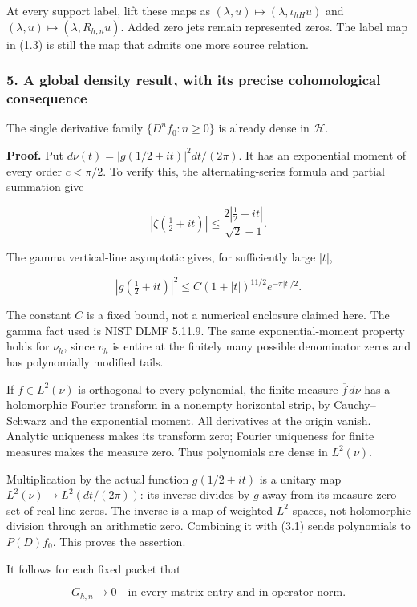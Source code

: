 At every support label, lift these maps as
\((\lambda,u)\mapsto(\lambda,\iota_{hH}u)\) and
\((\lambda,u)\mapsto(\lambda,R_{h,n}u)\). Added zero jets remain
represented zeros. The label map in (1.3) is still the map that admits
one more source relation.

\subsubsection{5. A global density result, with its precise cohomological
consequence}\label{pr_14:a-global-density-result-with-its-precise-cohomological-consequence}

The single derivative family \(\{D^nf_0:n\ge0\}\) is already dense in
\(\mathcal H\).

\textbf{Proof.} Put \(d\nu(t)=|g(1/2+it)|^2dt/(2\pi)\). It has an
exponential moment of every order \(c<\pi/2\). To verify this, the
alternating-series formula and partial summation give

\[|\zeta(\tfrac12+it)|\le\frac{2|\tfrac12+it|}{\sqrt2-1}.\]

The gamma vertical-line asymptotic gives, for sufficiently large
\(|t|\),

\[|g(\tfrac12+it)|^2\le C(1+|t|)^{11/2}e^{-\pi|t|/2}.\]

The constant \(C\) is a fixed bound, not a numerical enclosure claimed
here. The gamma fact used is NIST DLMF 5.11.9. The same
exponential-moment property holds for \(\nu_h\), since \(v_h\) is entire
at the finitely many possible denominator zeros and has polynomially
modified tails.

If \(f\in L^2(\nu)\) is orthogonal to every polynomial, the finite
measure \(\overline f\,d\nu\) has a holomorphic Fourier transform in a
nonempty horizontal strip, by Cauchy--Schwarz and the exponential
moment. All derivatives at the origin vanish. Analytic uniqueness makes
its transform zero; Fourier uniqueness for finite measures makes the
measure zero. Thus polynomials are dense in \(L^2(\nu)\).

Multiplication by the actual function \(g(1/2+it)\) is a unitary map
\(L^2(\nu)\to L^2(dt/(2\pi))\): its inverse divides by \(g\) away from
its measure-zero set of real-line zeros. The inverse is a map of
weighted \(L^2\) spaces, not holomorphic division through an arithmetic
zero. Combining it with (3.1) sends polynomials to \(P(D)f_0\). This
proves the assertion.

It follows for each fixed packet that

\[\boxed{G_{h,n}\longrightarrow0\quad\text{in every matrix entry and in operator norm}.}\tag{5.1}\]

